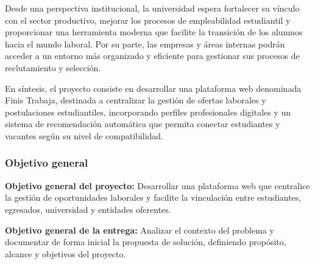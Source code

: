\documentclass[11pt,a4paper]{Plantilla}
\begin{document}
Desde una perspectiva institucional, la universidad espera fortalecer su vínculo con el sector productivo, mejorar los procesos de empleabilidad estudiantil y proporcionar una herramienta moderna que facilite la transición de los alumnos hacia el mundo laboral. Por su parte, las empresas y áreas internas podrán acceder a un entorno más organizado y eficiente para gestionar sus procesos de reclutamiento y selección.

\vspace{0.3cm}

En síntesis, el proyecto consiste en desarrollar una plataforma web denominada Finis Trabaja, destinada a centralizar la gestión de ofertas laborales y postulaciones estudiantiles, incorporando perfiles profesionales digitales y un sistema de recomendación automática que permita conectar estudiantes y vacantes según su nivel de compatibilidad.

\subsubsection{Objetivo general}%
\textbf{Objetivo general del proyecto:} Desarrollar una plataforma web que centralice la gestión de oportunidades laborales y facilite la vinculación entre estudiantes, egresados, universidad y entidades oferentes.

\textbf{Objetivo general de la entrega:} Analizar el contexto del problema y documentar de forma inicial la propuesta de solución, definiendo propósito, alcance y objetivos del proyecto.
\end{document}
